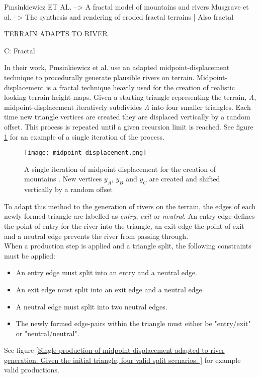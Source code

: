 Pmsinkiewicz ET AL. --> A fractal model of mountains and rivers
Musgrave et al. --> The synthesis and rendering of eroded fractal terrains | Also fractal 

TERRAIN ADAPTS TO RIVER

C: Fractal

In their work, Pmsinkiewicz et al. use an adapted midpoint-displacement technique to procedurally generate plausible rivers on terrain. Midpoint-displacement is a fractal technique heavily used for the creation of realistic looking terrain height-maps. Given a starting triangle representing the terrain, \textit{A}, midpoint-displacement iteratively subdivides \textit{A} into four smaller triangles. Each time new triangle vertices are created they are displaced vertically by a random offset. This process is repeated until a given recursion limit is reached. See figure \ref{Midpoint displacement} for an example of a single iteration of the process.

\begin{figure}[h]
  \centering
	\label{Midpoint displacement}
	\texttt{[image: midpoint\_displacement.png]}
	\caption{A single iteration of midpoint displacement for the creation of mountains \cite{Prusinkiewicz1993}. New vertices $y_{A}$, $y_{B}$ and $y_{C}$ are created and shifted vertically by a random offset}
\end{figure}

To adapt this method to the generation of rivers on the terrain, the edges of each newly formed triangle are labelled as \textit{entry}, \textit{exit} or \textit{neutral}. An entry edge defines the point of entry for the river into the triangle, an exit edge the point of exit and a neutral edge prevents the river from passing through.\\

When a production step is applied and a triangle split, the following constraints must be applied:
\begin{itemize}
\item An entry edge must split into an entry and a neutral edge.
\item An exit edge must split into an exit edge and a neutral edge.
\item A neutral edge must split into two neutral edges.
\item The newly formed edge-pairs within the triangle must either be "entry/exit" or "neutral/neutral".
\end{itemize}

See figure \ref{Single production of midpoint displacement adapted to river generation. Given the initial triangle, four valid split scenarios. } for example valid productions.

